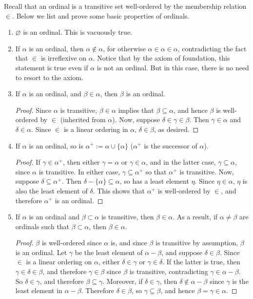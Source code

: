 \documentclass[12pt]{article}
\begin{document}
Recall that an ordinal is a transitive set well-ordered by the membership relation $\in$.  Below we list and prove some basic properties of ordinals.

\begin{enumerate}
\item $\varnothing$ is an ordinal.  This is vacuously true.
\item If $\alpha$ is an ordinal, then $\alpha\notin \alpha$, for otherwise $\alpha\in \alpha\in \alpha$, contradicting the fact that $\in$ is irreflexive on $\alpha$.  Notice that by the axiom of foundation, this statement is true even if $\alpha$ is not an ordinal.  But in this case, there is no need to resort to the axiom.
\item If $\alpha$ is an ordinal, and $\beta  \in \alpha$, then $\beta$ is an ordinal.
\begin{proof} Since $\alpha$ is transitive, $\beta\in \alpha$ implies that $\beta \subseteq \alpha$, and hence $\beta$ is well-ordered by $\in$ (inherited from $\alpha$).  Now, suppose $\delta \in \gamma\in \beta$.  Then $\gamma\in \alpha$ and $\delta\in \alpha$.  Since $\in$ is a linear ordering in $\alpha$, $\delta \in \beta$, as desired.
\end{proof}
\item If $\alpha$ is an ordinal, so is $\alpha^+:=\alpha \cup \lbrace \alpha\rbrace$ ($\alpha^+$ is the successor of $\alpha$).
\begin{proof}  If $\gamma\in \alpha^+$, then either $\gamma=\alpha$ or $\gamma \in \alpha$, and in the latter case, $\gamma\subseteq \alpha$, since $\alpha$ is transitive.  In either case, $\gamma \subseteq \alpha^+$ so that $\alpha^+$ is transitive.  Now, suppose $\delta\subseteq \alpha^+$.  Then $\delta - \lbrace \alpha\rbrace \subseteq\alpha$, so has a least element $\eta$.  Since $\eta\in \alpha$, $\eta$ is also the least element of $\delta$.  This shows that $\alpha^+$ is well-ordered by $\in$, and therefore $\alpha^+$ is an ordinal.
\end{proof}
\item If $\alpha$ is an ordinal and $\beta \subset \alpha$ is transitive, then $\beta \in \alpha$.  As a result, if $\alpha \ne \beta$ are ordinals such that $\beta\subset \alpha$, then $\beta\in \alpha$.
\begin{proof}  $\beta$ is well-ordered since $\alpha$ is, and since $\beta$ is transitive by assumption, $\beta$ is an ordinal.  Let $\gamma$ be the least element of $\alpha-\beta$, and suppose $\delta\in \beta$.  Since $\in$ is a linear ordering on $\alpha$, either $\delta\in \gamma$ or $\gamma\in \delta$.  If the latter is true, then $\gamma\in \delta\in \beta$, and therefore $\gamma\in \beta$ since $\beta$ is transitive, contradicting $\gamma \in \alpha - \beta$.  So $\delta\in \gamma$, and therefore $\beta \subseteq \gamma$.  Moreover, if $\delta\in \gamma$, then $\delta \notin \alpha-\beta$ since $\gamma$ is the least element in $\alpha-\beta$.  Therefore $\delta\in \beta$, so $\gamma\subseteq \beta$, and hence $\beta=\gamma\in \alpha$.

\end{proof}
\end{enumerate}
\end{document}
